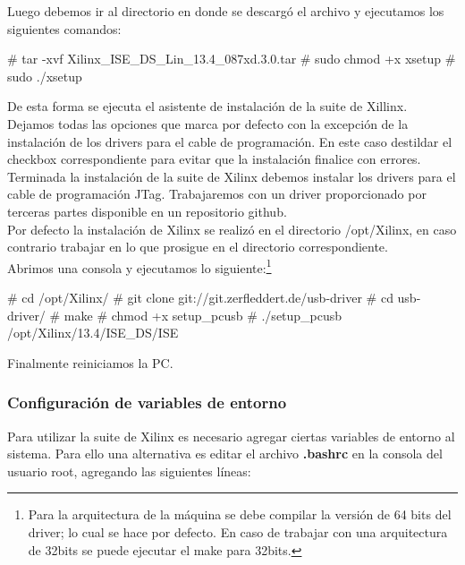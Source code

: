 Luego debemos ir al directorio en donde se descarg\'o el archivo y ejecutamos los siguientes comandos:

\begin{bash}
# tar -xvf Xilinx_ISE_DS_Lin_13.4_087xd.3.0.tar
# sudo chmod +x xsetup
# sudo ./xsetup
\end{bash}

De esta forma se ejecuta el asistente de instalación de la suite de Xillinx.\\

Dejamos todas las opciones que marca por defecto con la excepción de la instalación de los drivers para el cable de programación. En este caso destildar el checkbox correspondiente para evitar que la instalación finalice con errores.\\

Terminada la instalación de la suite de Xilinx debemos instalar los drivers para el cable de programación JTag. Trabajaremos con un driver proporcionado por terceras partes disponible en un repositorio github.\\

Por defecto la instalación de Xilinx se realizó en el directorio /opt/Xilinx, en caso contrario trabajar en lo que prosigue en el directorio correspondiente.\\

Abrimos una consola y ejecutamos lo siguiente:\footnote{Para la arquitectura de la máquina se debe compilar la versión de 64 bits del driver; lo cual se hace por defecto. En caso de trabajar con una arquitectura de 32bits se puede ejecutar el make para 32bits.}\\

\begin{bash}
# cd /opt/Xilinx/
# git clone git://git.zerfleddert.de/usb-driver
# cd usb-driver/
# make
# chmod +x setup_pcusb
# ./setup_pcusb /opt/Xilinx/13.4/ISE_DS/ISE
\end{bash}

Finalmente reiniciamos la PC.

\subsubsection{Configuración de variables de entorno}
Para utilizar la suite de Xilinx es necesario agregar ciertas variables de entorno al sistema. Para ello una alternativa es editar el archivo \textbf{.bashrc} en la consola del usuario root, agregando las siguientes líneas:\\

